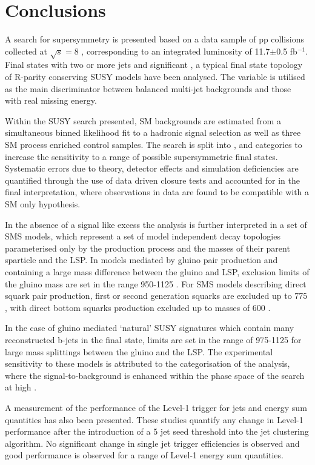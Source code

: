 \chapter{Conclusions}
\label{chap:conclusions}

A search for supersymmetry is presented based on a data sample of pp collisions collected at $\sqrt{s} = 8$ \TeV, corresponding to an integrated luminosity of 11.7$\pm$0.5 fb$^{-1}$. Final states with two or more jets and significant \met, a typical final state topology of R-parity conserving \ac{SUSY} models have been analysed. The \alphat variable is utilised as the main discriminator between balanced multi-jet backgrounds and those with real missing energy. 

Within the \ac{SUSY} search presented, \ac{SM} backgrounds are estimated from a simultaneous binned likelihood fit to a hadronic signal selection as well as three \ac{SM} process enriched control samples. The search is split into \theht, \nbreco and \njet categories to increase the sensitivity to a range of possible supersymmetric final states. Systematic errors due to theory, detector effects and simulation deficiencies are quantified through the use of data driven closure tests and accounted for in the final interpretation, where observations in data are found to be compatible with a \ac{SM} only hypothesis. 

In the absence of a signal like excess the analysis is further interpreted in a set of \ac{SMS} models, which represent a set of model independent decay topologies parameterised only by the production process and the masses of their parent sparticle and the \ac{LSP}. In models mediated by gluino pair production and containing a large mass difference between the gluino and \ac{LSP}, exclusion limits of the gluino mass are set in the range 950-1125 \GeV. For \ac{SMS} models describing direct squark pair production, first or second generation squarks are excluded up to 775 \GeV, with direct bottom squarks production excluded up to masses of 600 \GeV. 

In the case of gluino mediated `natural' \ac{SUSY} signatures which contain many reconstructed b-jets in the final state, limits are set in the range of 975-1125 \GeV for large mass splittings between the gluino and the \ac{LSP}. The experimental sensitivity to these models is attributed to the \nbreco categorisation of the analysis, where the signal-to-background is enhanced within the phase space of the search at high \nbreco.

A measurement of the performance of the Level-1 trigger for jets and energy sum quantities has also been presented. These studies quantify any change in Level-1 performance after the introduction of a 5 \GeV jet seed threshold into the jet clustering algorithm.  No significant change in single jet trigger efficiencies is observed and good performance is observed for a range of Level-1 energy sum quantities.

